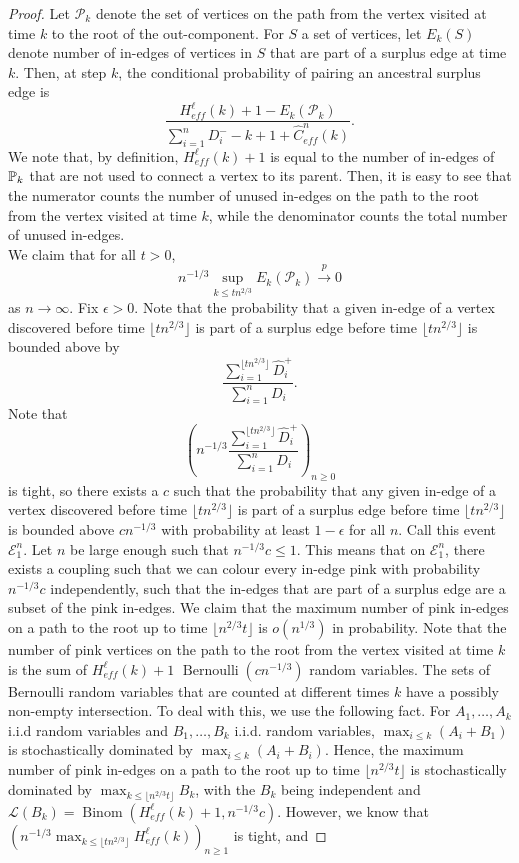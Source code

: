 \begin{proof}
Let $\mathcal{P}_k$ denote the set of vertices on the path from the vertex visited at time $k$ to the root of the out-component. For $S$ a set of vertices, let $E_k(S)$ denote number of in-edges of vertices in $S$ that are part of a surplus edge at time $k$. Then, at step $k$, the conditional probability of pairing an ancestral surplus edge is 
\begin{equation*}\label{eq.condprobsurplusedge}\frac{H^\ell_{eff}(k)+1-E_k(\mathcal{P}_k)}{\sum_{i=1}^n D^-_i-k+1+\hat{C}^n_{eff}(k)}.\end{equation*}
We note that, by definition, $H^\ell_{eff}(k)+1$ is equal to the number of in-edges of $\P_k$ that are not used to connect a vertex to its parent. Then, it is easy to see that the numerator counts the number of unused in-edges on the path to the root from the vertex visited at time $k$, while the denominator counts the total number of unused in-edges. \\
We claim that for all $t>0$, $$n^{-1/3}\sup_{k\leq tn^{2/3}}E_k(\mathcal{P}_k)\overset{p}{\to}0$$ as $n\to \infty$. Fix $\epsilon>0$. Note that the probability that a given in-edge of a vertex discovered before time $\lfloor t n^{2/3}\rfloor$ is part of a surplus edge before time $\lfloor t n^{2/3}\rfloor$ is bounded above by $$\frac{\sum_{i=1}^{\lfloor t n^{2/3}\rfloor} \hat{D}_i^+}{\sum_{i=1}^n D_i}.$$ Note that $$\left(n^{-1/3}\frac{\sum_{i=1}^{\lfloor t n^{2/3}\rfloor} \hat{D}_i^+}{\sum_{i=1}^n D_i}\right)_{n\geq 0}$$ is tight, so  there exists a $c$ such that the probability that any given in-edge of a vertex discovered before time $\lfloor t n^{2/3}\rfloor$ is part of a surplus edge before time $\lfloor t n^{2/3}\rfloor$ is bounded above $cn^{-1/3}$ with probability at least $1-\epsilon$ for all $n$. Call this event $\mathcal{E}^n_1$. Let $n$ be large enough such that $n^{-1/3}c\leq 1$. This means that on $\mathcal{E}^n_1$, there exists a coupling such that we can colour every in-edge pink with probability $n^{-1/3}c$ independently, such that the in-edges that are part of a surplus edge are a subset of the pink in-edges. We claim that the maximum number of pink in-edges on a path to the root up to time $\lfloor n^{2/3}t\rfloor$ is $o(n^{1/3})$ in probability. Note that the number of pink vertices on the path to the root from the vertex visited at time $k$ is the sum of $H^\ell_{eff}(k)+1$ $\operatorname{Bernoulli}(cn^{-1/3})$ random variables. The sets of Bernoulli random variables that are counted at different times $k$ have a possibly non-empty intersection. To deal with this, we use the following fact. For $A_1,\dots, A_k$ i.i.d random variables and $B_1,\dots,B_k$ i.i.d. random variables, $\max_{i\leq k} (A_i+B_1)$ is stochastically dominated by $\max_{i\leq k}(A_i+B_i)$. Hence, the maximum number of pink in-edges on a path to the root up to time $\lfloor n^{2/3}t\rfloor$ is  stochastically dominated by $\max_{k\leq \lfloor n^{2/3} t \rfloor} B_k$, with the $B_k$ being independent and $\mathcal{L}(B_k)=\operatorname{Binom}(H^\ell_{eff}(k)+1,n^{-1/3}c)$. However, we know that $\left(n^{-1/3}\max_{k\leq \lfloor tn^{2/3}\rfloor}H^\ell_{eff}(k)\right)_{n\geq 1}$ is tight, and

\end{proof}
